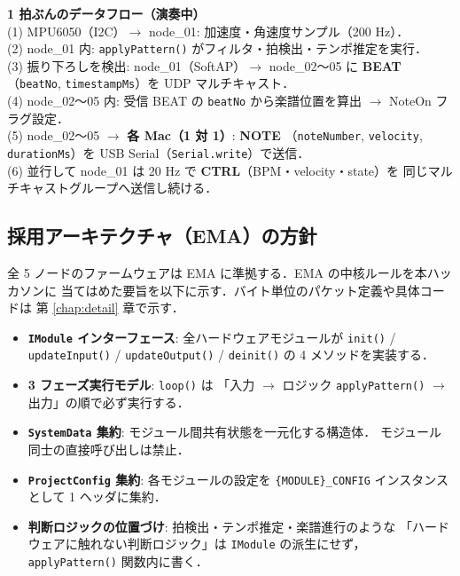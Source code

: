 \documentclass[lualatex,book,paper=a4paper,jafontsize=11.5pt,jafontscale=1.05]{jlreq}
\begin{document}
\begin{notebox}
\textbf{1 拍ぶんのデータフロー（演奏中）}\\[2pt]
(1) MPU6050（I2C）$\to$ node\_01: 加速度・角速度サンプル（200 Hz）．\\
(2) node\_01 内: \texttt{applyPattern()} がフィルタ・拍検出・テンポ推定を実行．\\
(3) 振り下ろしを検出: node\_01（SoftAP）$\to$ node\_02〜05 に \textbf{BEAT}
   （\texttt{beatNo}, \texttt{timestampMs}）を UDP マルチキャスト．\\
(4) node\_02〜05 内: 受信 BEAT の \texttt{beatNo} から楽譜位置を算出 $\to$ NoteOn フラグ設定．\\
(5) node\_02〜05 $\to$ \textbf{各 Mac（1 対 1）}: \textbf{NOTE}
   （\texttt{noteNumber}, \texttt{velocity}, \texttt{durationMs}）を
   USB Serial（\texttt{Serial.write}）で送信．\\
(6) 並行して node\_01 は 20 Hz で \textbf{CTRL}（BPM・velocity・state）を
   同じマルチキャストグループへ送信し続ける．
\end{notebox}

\subsection{採用アーキテクチャ（EMA）の方針}

全 5 ノードのファームウェアは EMA に準拠する．EMA の中核ルールを本ハッカソンに
当てはめた要旨を以下に示す．バイト単位のパケット定義や具体コードは
第 \ref{chap:detail} 章で示す．

\begin{itemize}
  \item \textbf{\texttt{IModule} インターフェース}: 全ハードウェアモジュールが
        \texttt{init()} / \texttt{updateInput()} / \texttt{updateOutput()} / \texttt{deinit()}
        の 4 メソッドを実装する．
  \item \textbf{3 フェーズ実行モデル}: \texttt{loop()} は
        「入力 $\to$ ロジック \texttt{applyPattern()} $\to$ 出力」の順で必ず実行する．
  \item \textbf{\texttt{SystemData} 集約}: モジュール間共有状態を一元化する構造体．
        モジュール同士の直接呼び出しは禁止．
  \item \textbf{\texttt{ProjectConfig} 集約}: 各モジュールの設定を
        \texttt{\{MODULE\}\_CONFIG} インスタンスとして 1 ヘッダに集約．
  \item \textbf{判断ロジックの位置づけ}: 拍検出・テンポ推定・楽譜進行のような
        「ハードウェアに触れない判断ロジック」は \texttt{IModule} の派生にせず，
        \texttt{applyPattern()} 関数内に書く．
\end{itemize}
\end{document}
